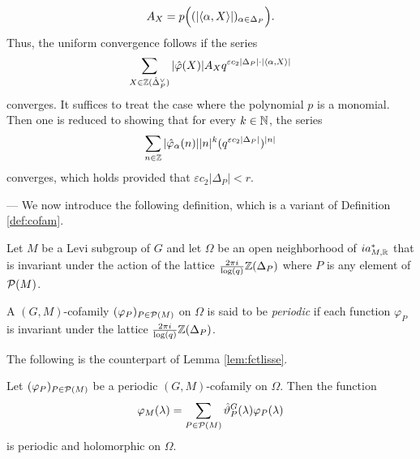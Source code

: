 \begin{paragr}
\begin{preuve}
$$A_X=p\Bigl((|\langle \alpha ,X  \rangle|)_{\alpha\in \Delta_P}\Bigr).$$ 
Thus, the uniform convergence follows if the series 
$$\sum_{X\in \mathbb{Z}(\hat{\Delta}_P^\vee)} |\hat{\varphi}(X)| A_X q^{ \varepsilon c_2 |\Delta_P|\cdot |\langle \alpha ,X  \rangle|   }$$
converges. It suffices to treat the case where the polynomial $p$ is a monomial. Then one is reduced to showing that for every $k\in \mathbb{N}$, the series
$$\sum_{n\in \mathbb{Z}} |\hat{\varphi}_\alpha(n)| |n|^k  (q^{ \varepsilon c_2  |\Delta_P|})^{|n|}$$
converges, which holds provided that $\varepsilon c_2|\Delta_P|<r$.
\end{preuve}
\end{paragr}

\begin{paragr} --- We now introduce the following definition, which is a variant of Definition \ref{def:cofam}.
  

\begin{definition}\label{def:cofamper}
    Let $M$ be a Levi subgroup of $G$ and let $\Omega$ be an open neighborhood of $ia_{M,\mathbb{R}}^*$ that is invariant under the action of the lattice $\frac{2\pi i}{\log(q)} \mathbb{Z}(\Delta_P)$ where $P$ is any element of $\mathcal{P}(M)$.

A $(G,M)$-cofamily $(\varphi_P)_{P\in \mathcal{P}(M)}$ on $\Omega$ is said to be \emph{periodic} if each function $\varphi_P$ is invariant under the lattice $\frac{2\pi i}{\log(q)} \mathbb{Z}(\Delta_P)$.
\end{definition}

The following is the counterpart of Lemma \ref{lem:fctlisse}.

\begin{lemme}\label{lem:fctlisseper}
  Let $(\varphi_P)_{P\in \mathcal{P}(M)}$ be a periodic $(G,M)$-cofamily on $\Omega$. Then the function 
$$\varphi_M(\lambda)=\sum_{P\in \mathcal{P}(M)} \hat{\vartheta}_P^G(\lambda) \varphi_P(\lambda)$$
is periodic and holomorphic on $\Omega$.
\end{lemme}


\end{paragr}
